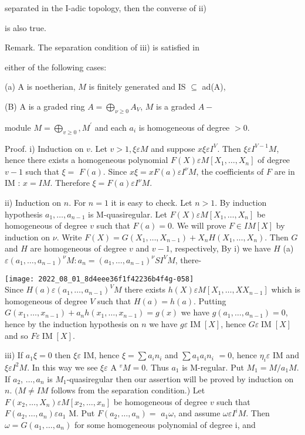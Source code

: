 separated in the I-adic topology, then the converse of ii)

is also true.

Remark. The separation condition of iii) is satisfied in

either of the following cases:

(a) A is noetherian, $M$ is finitely generated and IS $\subseteq$ ad(A),

(B) A is a graded ring $A=\bigoplus_{\nu \geqslant 0} A_{V}$, $M$ is a graded $A-$

module $M=\underset{v \geqslant 0}{\bigoplus}, M^{\prime}$ and each $a_{i}$ is homogeneous of degree $>0 .$

Proof. i) Induction on $v$. Let $v>1, \xi \varepsilon M$ and suppose $x \xi \varepsilon I^{V}$. Then $\xi \varepsilon I^{V-1} M$, hence there exists a homogeneous polynomial $F(X) \varepsilon M\left[X_{1}, \ldots, X_{n}\right]$ of degree $v-1$ such that $\xi=$ $F(a)$. Since $x \xi=x F(a) \varepsilon I^{\nu} M$, the coefficients of $F$ are in IM : $x=I M$. Therefore $\xi=F(a) \varepsilon I^{\nu} M$.

ii) Induction on $n$. For $n=1$ it is easy to check. Let $n>1$. By induction hypothesis $a_{1}, \ldots, a_{n-1}$ is M-quasiregular. Let $F(X) \varepsilon M\left[X_{1}, \ldots, X_{n}\right]$ be homogeneous of degree $v$ such that $F(a)=0$. We will prove $F \in I M[X]$ by induction on $\nu$. Write $F(X)=G\left(X_{1}, \ldots, X_{n-1}\right)+X_{n} H\left(X_{1}, \ldots, X_{n}\right)$. Then $G$ and $H$ are homogeneous of degree $v$ and $v-1$, respectively, By i) we have $H$ (a) $\varepsilon\left(a_{1}, \ldots, a_{n-1}\right)^{\nu} M: a_{n}=\left(a_{1}, \ldots, a_{n-1}\right)^{\nu} S I^{V} M$, there-

\texttt{[image: 2022\_08\_01\_8d4eee36f1f42236b4f4g-058]}\\
Since $H(a) \varepsilon\left(a_{1}, \ldots, a_{n-1}\right)^{V} M$ there exists $h(X) \varepsilon M\left[X_{1}, \ldots, X X_{n-1}\right]$ which is homogeneous of degree $V$ such that $H(a)=h(a)$. Putting $G\left(x_{1}, \ldots, x_{n-1}\right)+a_{n} h\left(x_{1}, \ldots, x_{n-1}\right)=g(x)$ we have $g\left(a_{1}, \ldots, a_{n-1}\right)=0$, hence by the induction hypothesis on $n$ we have $g \varepsilon \operatorname{IM}[X]$, hence $G \varepsilon \operatorname{IM}[X]$ and so $F \varepsilon \operatorname{IM}[X]$.

iii) If $a_{1} \xi=0$ then $\xi \varepsilon$ IM, hence $\xi=\sum a_{i} n_{i}$ and $\sum a_{1} a_{i} n_{i}$ $=0$, hence $\eta_{i} \varepsilon$ IM and $\xi \varepsilon I^{2} M$. In this way we see $\xi \varepsilon$ A $^{v} M=0$. Thus $a_{1}$ is M-regular. Put $M_{1}=M / a_{1} M$. If $a_{2}$, $\ldots, a_{n}$ is $M_{1}$-quasiregular then our assertion will be proved by induction on $n$. $(M \neq I M$ follows from the separation condition.) Let $F\left(x_{2}, \ldots, X_{n}\right) \varepsilon M\left[x_{2}, \ldots, x_{n}\right]$ be homogeneous of degree $v$ such that $F\left(a_{2}, \ldots, a_{n}\right) \varepsilon a_{1}$ M. Put $F\left(a_{2}, \ldots, a_{n}\right)=$ $a_{1} \omega$, and assume $\omega \varepsilon I^{i} M$. Then $\omega=G\left(a_{1}, \ldots, a_{n}\right)$ for some homogeneous polynomial of degree i, and

